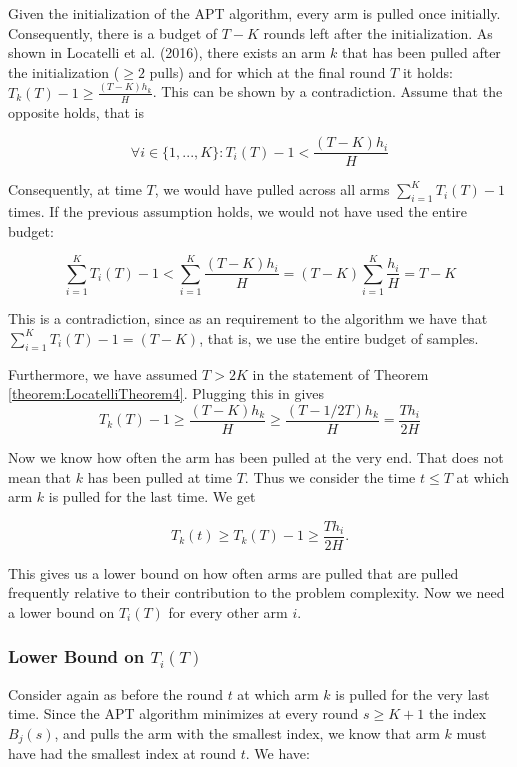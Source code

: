 \documentclass[12pt,]{article}
\begin{document}
Given the initialization of the APT algorithm, every arm is pulled once
initially. Consequently, there is a budget of \(T-K\) rounds left after
the initialization. As shown in Locatelli et al. (2016), there exists an
arm \(k\) that has been pulled after the initialization (\(\geq 2\)
pulls) and for which at the final round \(T\) it holds:
\(T_k(T) - 1 \geq \frac{(T-K)h_k}{H}\). This can be shown by a
contradiction. Assume that the opposite holds, that is

\[
\forall i \in \{1,...,K\}: T_i(T) - 1 < \frac{(T-K)h_i}{H}
\]

Consequently, at time \(T\), we would have pulled across all arms
\(\sum_{i=1}^KT_i(T)-1\) times. If the previous assumption holds, we
would not have used the entire budget:

\[
\sum_{i=1}^K T_i(T)-1 < \sum_{i=1}^K \frac{(T-K)h_i}{H} = (T-K)\sum_{i=1}^K \frac{h_i}{H} = T-K
\]

This is a contradiction, since as an requirement to the algorithm we
have that \(\sum_{i=1}^K T_i(T)-1 = (T-K)\), that is, we use the entire
budget of samples.

Furthermore, we have assumed \(T>2K\) in the statement of Theorem
\ref{theorem:LocatelliTheorem4}. Plugging this in gives \[
T_k(T) - 1 \geq \frac{(T-K)h_k}{H} \geq \frac{(T-1/2T)h_k}{H} = \frac{Th_i}{2H}
\]

Now we know how often the arm has been pulled at the very end. That does
not mean that \(k\) has been pulled at time \(T\). Thus we consider the
time \(t \leq T\) at which arm \(k\) is pulled for the last time. We get

\[
T_k(t) \geq T_k(T) - 1 \geq \frac{Th_i}{2H}.
\]

This gives us a lower bound on how often arms are pulled that are pulled
frequently relative to their contribution to the problem complexity. Now
we need a lower bound on \(T_i(T)\) for every other arm \(i\).

\subsubsection{\texorpdfstring{Lower Bound on
\(T_i(T)\)}{Lower Bound on T\_i(T)}}\label{lower-bound-on-t_it}

Consider again as before the round \(t\) at which arm \(k\) is pulled
for the very last time. Since the APT algorithm minimizes at every round
\(s \geq K+1\) the index \(B_j(s)\), and pulls the arm with the smallest
index, we know that arm \(k\) must have had the smallest index at round
\(t\). We have:
\end{document}
